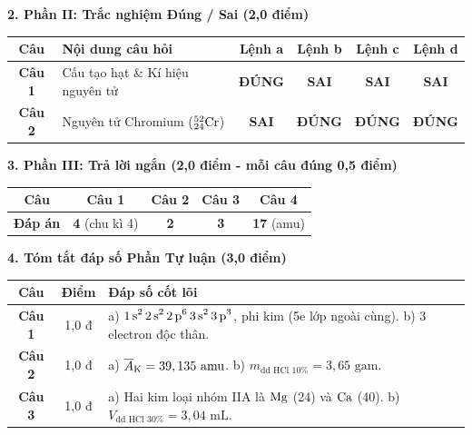 \documentclass[11pt,a4paper]{article}
\begin{document}
\vspace{2pt}
\noindent
\textbf{\color{mainGreen}2. Phần II: Trắc nghiệm Đúng / Sai (2,0 điểm)}
\begin{center}
\renewcommand{\arraystretch}{1.2}
\begin{tabular}{|c|l|c|c|c|c|}
\hline
\rowcolor{tableGreen}
\textbf{Câu} & \textbf{Nội dung câu hỏi} & \textbf{Lệnh a} & \textbf{Lệnh b} & \textbf{Lệnh c} & \textbf{Lệnh d} \\
\hline
\textbf{Câu 1} & Cấu tạo hạt \& Kí hiệu nguyên tử & \textbf{\color{hfRed}ĐÚNG} & \textbf{SAI} & \textbf{SAI} & \textbf{SAI} \\
\hline
\textbf{Câu 2} & Nguyên tử Chromium ($^{52}_{24}\ce{Cr}$) & \textbf{SAI} & \textbf{\color{hfRed}ĐÚNG} & \textbf{\color{hfRed}ĐÚNG} & \textbf{\color{hfRed}ĐÚNG} \\
\hline
\end{tabular}
\end{center}

\vspace{2pt}
\noindent
\textbf{\color{mainGreen}3. Phần III: Trả lời ngắn (2,0 điểm - mỗi câu đúng 0,5 điểm)}
\begin{center}
\renewcommand{\arraystretch}{1.2}
\begin{tabular}{|c|c|c|c|c|}
\hline
\rowcolor{tableGreen}
\textbf{Câu} & \textbf{Câu 1} & \textbf{Câu 2} & \textbf{Câu 3} & \textbf{Câu 4} \\
\hline
\textbf{Đáp án} & \textbf{\color{hfRed}4} (chu kì 4) & \textbf{\color{hfRed}2} & \textbf{\color{hfRed}3} & \textbf{\color{hfRed}17} (amu) \\
\hline
\end{tabular}
\end{center}

\vspace{2pt}
\noindent
\textbf{\color{mainGreen}4. Tóm tắt đáp số Phần Tự luận (3,0 điểm)}
\begin{center}
\renewcommand{\arraystretch}{1.2}
\begin{tabular}{|c|c|p{11.5cm}|}
\hline
\rowcolor{tableGreen}
\textbf{Câu} & \textbf{Điểm} & \textbf{Đáp số cốt lõi} \\
\hline
\textbf{Câu 1} & 1,0 đ & a) $\ce{1s^2 2s^2 2p^6 3s^2 3p^3}$, phi kim (5e lớp ngoài cùng). \quad b) 3 electron độc thân. \\
\hline
\textbf{Câu 2} & 1,0 đ & a) $\overline{A}_{\ce{K}} = 39,135\text{ amu}$. \quad b) $m_{\text{dd HCl 10\%}} = 3,65\text{ gam}$. \\
\hline
\textbf{Câu 3} & 1,0 đ & a) Hai kim loại nhóm IIA là $\ce{Mg}$ (24) và $\ce{Ca}$ (40). \quad b) $V_{\text{dd HCl 30\%}} = 3,04\text{ mL}$. \\
\hline
\end{tabular}
\end{center}
\end{document}
